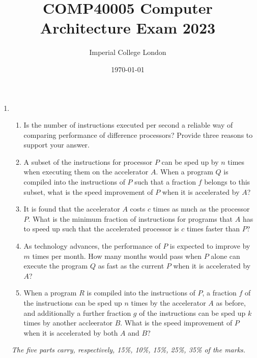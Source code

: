 \documentclass[11pt]{article}
\title{COMP40005 Computer Architecture Exam 2023}
\author{Imperial College London}
\date{\today}
\begin{document}
\maketitle

\begin{enumerate}
    \item \begin{enumerate}
        \item Is the number of instructions executed per second a reliable way of comparing performance of difference processors? Provide three reasons to support your answer.
        \item A subset of the instructions for processor $P$ can be sped up by $n$ times when executing them on the accelerator $A$. When a program $Q$ is compiled into the instructions of $P$ such that a fraction $f$ belongs to this subset, what is the speed improvement of $P$ when it is accelerated by $A$?
        \item It is found that the accelerator $A$ costs $c$ times as much as the processor $P$. What is the minimum fraction of instructions for programs that $A$ has to speed up such that the accelerated processor is $c$ times faster than $P$?
        \item As technology advances, the performance of $P$ is expected to improve by $m$ times per month. How many months would pass when $P$ alone can execute the program $Q$ as fast as the current $P$ when it is accelerated by $A$?
        \item When a program $R$ is compiled into the instructions of $P$, a fraction $f$ of the instructions can be sped up $n$ times by the accelerator $A$ as before, and additionally a further fraction $g$ of the instructions can be sped up $k$ times by another accleerator $B$. What is the speed improvement of $P$ when it is accelerated by both $A$ and $B$?
    \end{enumerate}

    \vfill
    \emph{The five parts carry, respectively, 15\%, 10\%, 15\%, 25\%, 35\% of the marks.}

    \pagebreak


\end{enumerate}
\end{document}
